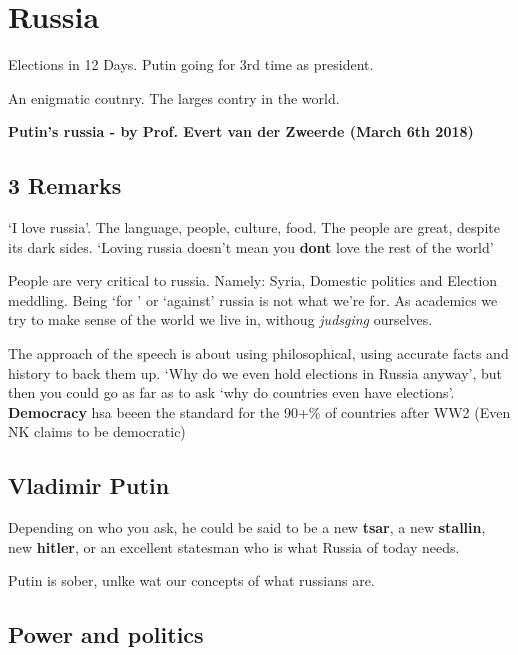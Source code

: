 
\section{Russia} 

Elections in 12 Days. Putin going for 3rd time as president.

An enigmatic coutnry. The larges contry in the world.

\textbf{Putin's russia - by Prof. Evert van der Zweerde (March 6th 2018)}



\subsection{3 Remarks} \label{sub:3_remarks}

`I love russia'. The language, people, culture, food. The people are great, despite its dark sides. `Loving russia doesn't mean you \textbf{dont} love the rest of the world'

People are very critical to russia. Namely: Syria, Domestic politics and Election meddling. Being `for ' or `against' russia is not what we're for. As academics we try to make sense of the world we live in, withoug \textit{judsging} ourselves.

The approach of the speech is about using philosophical, using accurate facts and history to back them up.
`Why do we even hold elections in Russia anyway', but then you could go as far as to ask `why do countries even have elections'. \textbf{Democracy} hsa beeen the standard for the 90+\% of countries after WW2 (Even NK claims to be democratic)


\subsection{Vladimir Putin} \label{sub:vladimir_putin}

Depending on who you ask, he could be said to be a new \textbf{tsar}, a new \textbf{stallin}, new \textbf{hitler}, or an excellent statesman who is what Russia of today needs.

Putin is sober, unlke wat our concepts of what russians are.




\subsection{Power and politics}

